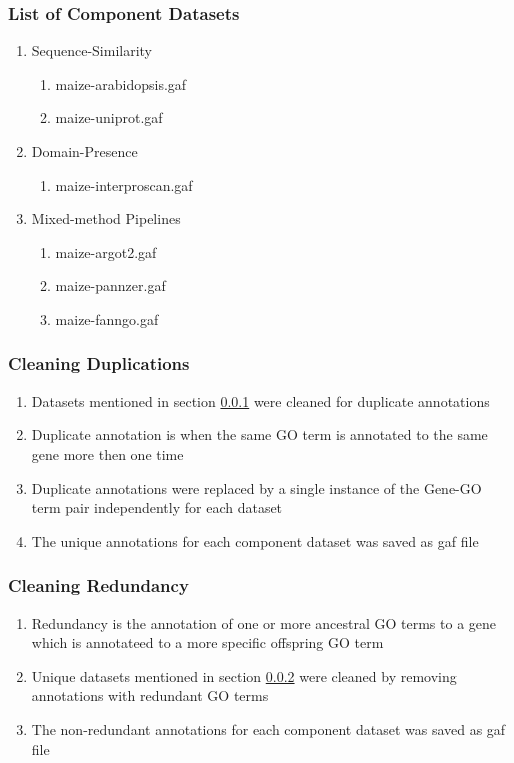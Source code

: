       \subsubsection{List of Component Datasets} \label{subsec:comp_data}
      \begin{enumerate}
        \item Sequence-Similarity
        \begin{enumerate}
          \item maize-arabidopsis.gaf
          \item maize-uniprot.gaf
        \end{enumerate}
        \item Domain-Presence
        \begin{enumerate}
          \item maize-interproscan.gaf
        \end{enumerate}
        \item Mixed-method Pipelines
        \begin{enumerate}
          \item maize-argot2.gaf
          \item maize-pannzer.gaf
          \item maize-fanngo.gaf
        \end{enumerate}
      \end{enumerate}
    \subsubsection{Cleaning Duplications} \label{subsec:remove_dup}
    \begin{enumerate}
      \item Datasets mentioned in section \ref{subsec:comp_data} were cleaned for duplicate annotations
      \item Duplicate annotation is when the same GO term is annotated to the same gene more then one time
      \item Duplicate annotations were replaced by a single instance of the Gene-GO term pair independently for each dataset
      \item The unique annotations for each component dataset was saved as gaf file
    \end{enumerate}
    \subsubsection{Cleaning Redundancy} \label{subsec:nonred_dat}
    \begin{enumerate}
      \item Redundancy is the annotation of one or more ancestral GO terms to a gene which is annotateed to a more specific offspring GO term
      \item Unique datasets mentioned in section \ref{subsec:remove_dup} were cleaned by removing annotations with redundant GO terms
      \item The non-redundant annotations for each component dataset was saved as gaf file
    \end{enumerate}
